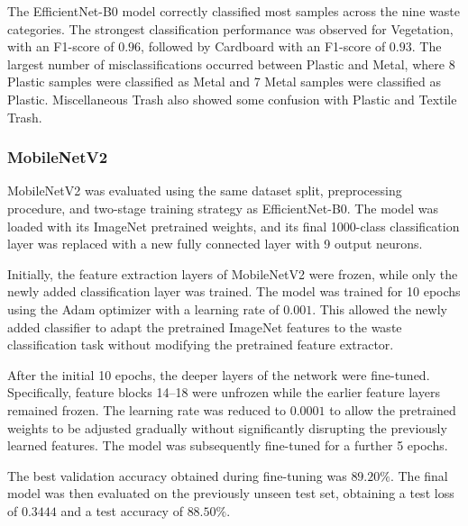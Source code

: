 \documentclass[12pt,a4paper]{article}
\begin{document}
The EfficientNet-B0 model correctly classified most samples across the
nine waste categories. The strongest classification performance was
observed for Vegetation, with an F1-score of $0.96$, followed by Cardboard
with an F1-score of $0.93$. The largest number of misclassifications
occurred between Plastic and Metal, where 8 Plastic samples were
classified as Metal and 7 Metal samples were classified as Plastic.
Miscellaneous Trash also showed some confusion with Plastic and Textile
Trash.

\subsubsection{MobileNetV2}

MobileNetV2 was evaluated using the same dataset split, preprocessing
procedure, and two-stage training strategy as EfficientNet-B0. The model
was loaded with its ImageNet pretrained weights, and its final 1000-class
classification layer was replaced with a new fully connected layer with
9 output neurons.

Initially, the feature extraction layers of MobileNetV2 were frozen,
while only the newly added classification layer was trained. The model
was trained for 10 epochs using the Adam optimizer with a learning rate
of $0.001$. This allowed the newly added classifier to adapt the
pretrained ImageNet features to the waste classification task without
modifying the pretrained feature extractor.

After the initial 10 epochs, the deeper layers of the network were
fine-tuned. Specifically, feature blocks 14--18 were unfrozen while the
earlier feature layers remained frozen. The learning rate was reduced to
$0.0001$ to allow the pretrained weights to be adjusted gradually without
significantly disrupting the previously learned features. The model was
subsequently fine-tuned for a further 5 epochs.

The best validation accuracy obtained during fine-tuning was $89.20\%$.
The final model was then evaluated on the previously unseen test set,
obtaining a test loss of $0.3444$ and a test accuracy of $88.50\%$.
\end{document}
